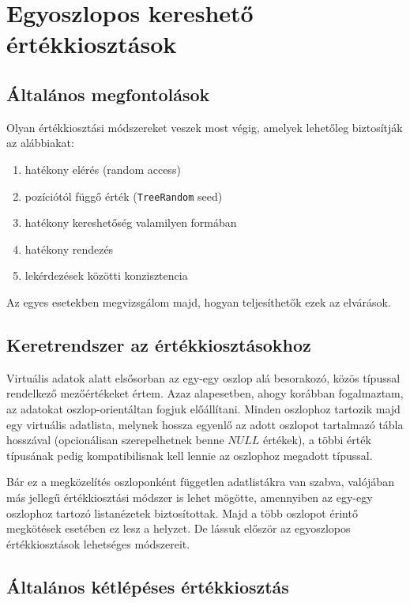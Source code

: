 \documentclass[
    parspace,
    noindent,
    nohyp,
]{elteiktdk}[2023/04/10]
\begin{document}
\section{Egyoszlopos kereshető értékkiosztások}

\subsection{Általános megfontolások}

Olyan értékkiosztási módszereket veszek most végig,
amelyek lehetőleg biztosítják az alábbiakat:

\begin{enumerate}
  \item hatékony elérés (random access)
  \item pozíciótól függő érték (\texttt{TreeRandom} seed)
  \item hatékony kereshetőség valamilyen formában
  \item hatékony rendezés
  \item lekérdezések közötti konzisztencia
\end{enumerate}

Az egyes esetekben megvizsgálom majd, hogyan teljesíthetők ezek az elvárások.

\subsection{Keretrendszer az értékkiosztásokhoz}

Virtuális adatok alatt elsősorban az egy-egy oszlop alá besorakozó,
közös típussal rendelkező mezőértékeket értem.
Azaz alapesetben, ahogy korábban fogalmaztam, az adatokat oszlop-orientáltan fogjuk előállítani.
Minden oszlophoz tartozik majd egy virtuális adatlista,
melynek hossza egyenlő az adott oszlopot tartalmazó tábla hosszával
(opcionálisan szerepelhetnek benne $NULL$ értékek),
a többi érték típusának pedig kompatibilisnak kell lennie az oszlophoz megadott típussal.

Bár ez a megközelítés oszloponként független adatlistákra van szabva,
valójában más jellegű értékkiosztási módszer is lehet mögötte,
amennyiben az egy-egy oszlophoz tartozó listanézetek biztosítottak.
Majd a több oszlopot érintő megkötések esetében ez lesz a helyzet.
De lássuk először az egyoszlopos értékkiosztások lehetséges módszereit.

\subsection{Általános kétlépéses értékkiosztás}
\end{document}
